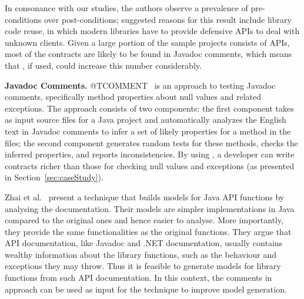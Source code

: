In consonance with our studies, the authors observe a prevalence of pre-conditions over post-conditions; suggested reasons for this result include library code reuse, in which modern libraries have to provide defensive APIs to deal with unknown clients. Given a large portion of the sample projects consists of APIs, most of the contracts are likely to be found in Javadoc comments, which means that \contractjdoc{}, if used, could increase this number considerably.

\textbf{Javadoc Comments.}
@TCOMMENT~\cite{atComment} is an approach to testing Javadoc comments, specifically method properties about null values and related exceptions. The approach consists of two components: the first component takes as input source files for a Java project and automatically analyzes the English text in Javadoc comments to
infer a set of likely properties for a method in the files; the second component generates random tests for these methods, checks the inferred properties, and reports inconsistencies. By using
\contractjdoc{}, a developer can write contracts richer than those for checking null values and exceptions (as presented in Section~\ref{sec:caseStudy}).

Zhai et al.~\cite{docAnalysis} present a technique that builds models for Java API functions by analysing the documentation. Their models are simpler implementations in Java compared to the original ones and hence easier to analyse. More importantly, they provide the same functionalities as the original functions. They argue that API documentation, like Javadoc and .NET documentation, usually contains wealthy information about the library functions, such as the behaviour and exceptions they may throw. Thus it is feasible to generate models for library functions from such API documentation. In this context, the comments in \contractjdoc{} approach can be used as input for the technique to improve model generation.


